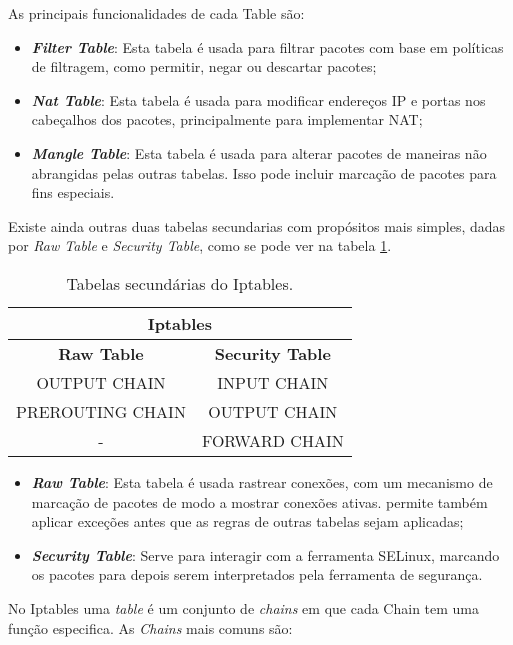 As principais funcionalidades de cada Table são:

\begin{itemize}
\item \textbf{\textit{Filter Table}}: Esta tabela é usada para filtrar pacotes com base em 
políticas de filtragem, como permitir, negar ou descartar pacotes;
\item \textbf{\textit{Nat Table}}: Esta tabela é usada para modificar endereços IP e portas
nos cabeçalhos dos pacotes, principalmente para implementar NAT;
\item \textbf{\textit{Mangle Table}}: Esta tabela é usada para alterar pacotes de maneiras
não abrangidas pelas outras tabelas. Isso pode incluir marcação de pacotes para fins especiais.
\end{itemize}



Existe ainda outras duas tabelas secundarias com propósitos mais simples, dadas 
por \textit{Raw Table} e \textit{Security Table}, como se pode ver na
tabela \ref{ipt2}.


\begin{table}[h]
\centering
\begin{tabular}{|c|c|}
\hline
\multicolumn{2}{|c|}{Iptables}\\
\hline
\rowcolor{yellow!50}\textbf{Raw Table} & \textbf{Security Table}\\
\hline
OUTPUT CHAIN & INPUT CHAIN \\
\hline
PREROUTING CHAIN & OUTPUT CHAIN \\
\hline
- & FORWARD CHAIN \\
\hline
\end{tabular}
\caption{Tabelas secundárias do Iptables.}
\label{ipt2}
\end{table}
    

\begin{itemize}
\item \textbf{\textit{Raw Table}}: Esta tabela é usada rastrear conexões, com um mecanismo de
marcação de pacotes de modo a mostrar conexões ativas. permite também aplicar
exceções antes que as regras de outras tabelas sejam aplicadas;
\item \textbf{\textit{Security Table}}: Serve para interagir com a ferramenta SELinux, marcando
os pacotes para depois serem interpretados pela ferramenta de segurança.
\end{itemize}



No Iptables uma \textit{table} é um conjunto de \textit{chains} em que cada Chain tem uma função
especifica. As \textit{Chains} mais comuns são:

